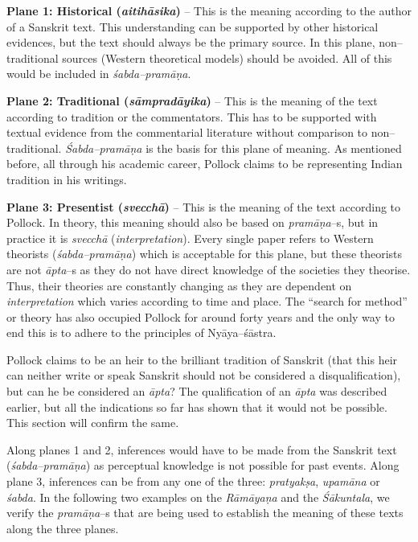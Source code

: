 \textbf{Plane 1: Historical (\textit{aitihāsika})} – This is the meaning according to the author of a Sanskrit text. This understanding can be supported by other historical evidences, but the text should always be the primary source. In this plane, non–traditional sources (Western theoretical models) should be avoided. All of this would be included in \textit{śabda–pramāṇa}.

\textbf{Plane 2: Traditional (\textit{sāmpradāyika})} – This is the meaning of the text according to tradition or the commentators. This has to be supported with textual evidence from the commentarial literature without comparison to non–traditional. \textit{Śabda–pramāṇa} is the basis for this plane of meaning. As mentioned before, all through his academic career, Pollock claims to be representing Indian tradition in his writings.

\textbf{Plane 3: Presentist (\textit{svecchā})} – This is the meaning of the text according to Pollock. In theory, this meaning should also be based on \textit{pramāṇa}–s, but in practice it is \textit{svecchā} (\textit{interpretation}). Every single paper refers to Western theorists (\textit{śabda–pramāṇa}) which is acceptable for this plane, but these theorists are not \textit{āpta}–s as they do not have direct knowledge of the societies they theorise. Thus, their theories are constantly changing as they are dependent on \textit{interpretation} which varies according to time and place. The “search for method” or theory has also occupied Pollock for around forty years and the only way to end this is to adhere to the principles of Nyāya–śāstra.

Pollock claims to be an heir to the brilliant tradition of Sanskrit (that this heir can neither write or speak Sanskrit should not be considered a disqualification), but can he be considered an \textit{āpta}? The qualification of an \textit{āpta} was described earlier, but all the indications so far has shown that it would not be possible. This section will confirm the same.

Along planes 1 and 2, inferences would have to be made from the Sanskrit text (\textit{śabda–pramāṇa}) as perceptual knowledge is not possible for past events. Along plane 3, inferences can be from any one of the three: \textit{pratyakṣa}, \textit{upamāna } or \textit{śabda}. In the following two examples on the \textit{Rāmāyaṇa} and the \textit{Śākuntala}, we verify the \textit{pramāṇa}–s that are being used to establish the meaning of these texts along the three planes.

